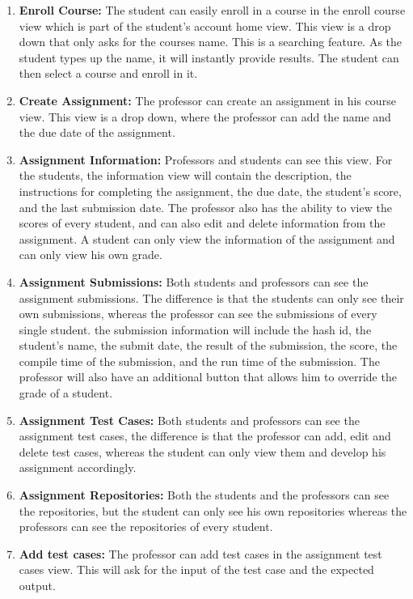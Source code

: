 \begin{enumerate}
\item \textbf{Enroll Course:} The student can easily enroll in a course in the
enroll course view which is part of the student's account home view. This view
is a drop down that only asks for the courses name. This is a searching feature.
As the student types up the name, it will instantly provide results. The student
can then select a course and enroll in it.

\item \textbf{Create Assignment:} The professor can create an assignment in his
course view. This view is a drop down, where the professor can add the name and
the due date of the assignment.

\item \textbf{Assignment Information:} Professors and students can see this
view. For the students, the information view will contain the description, the
instructions for completing the assignment, the due date, the student's score,
and the last submission date. The professor also has the ability to view the
scores of every student, and can also edit and delete information from the
assignment. A student can only view the information of the assignment and can
only view his own grade.

\item \textbf{Assignment Submissions:} Both students and professors can see the
assignment submissions. The difference is that the students can only see their
own submissions, whereas the professor can see the submissions of every single
student. the submission information will include the hash id, the student's
name, the submit date, the result of the submission, the score, the compile time
of the submission, and the run time of the submission. The professor will also
have an additional button that allows him to override the grade of a student.

\item \textbf{Assignment Test Cases:} Both students and professors can see the
assignment test cases, the difference is that the professor can add, edit and
delete test cases, whereas the student can only view them and develop his
assignment accordingly.

\item \textbf{Assignment Repositories:} Both the students and the professors can
see the repositories, but the student can only see his own repositories whereas
the professors can see the repositories of every student.

\item \textbf{Add test cases:} The professor can add test cases in the
assignment test cases view. This will ask for the input of the test case and the
expected output.


\end{enumerate}
